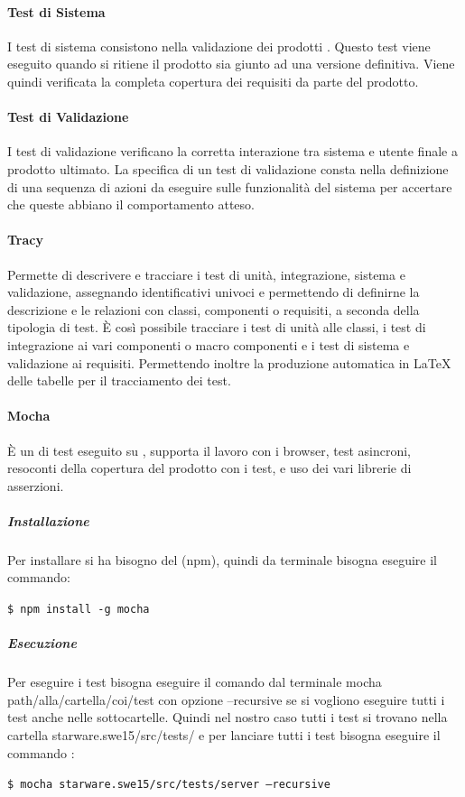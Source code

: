 \documentclass[12pt,a4paper]{article}
\begin{document}
\paragraph{Test di Sistema}

I test di sistema consistono nella validazione dei prodotti . Questo test viene eseguito quando si ritiene il prodotto sia giunto ad una versione definitiva. Viene quindi verificata la completa copertura dei requisiti da parte del prodotto.

\paragraph{Test di Validazione}

I test di validazione verificano la corretta interazione tra sistema e utente finale a prodotto ultimato.
La specifica di un test di validazione consta nella definizione di una sequenza di azioni da eseguire sulle funzionalità del sistema per accertare che queste abbiano il comportamento atteso.


\paragraph{Tracy}\label{tracciamentoTest}

Permette di descrivere e tracciare i test di unità, integrazione, sistema e validazione, assegnando identificativi univoci e permettendo di definirne la descrizione e le relazioni con classi, componenti o requisiti, a seconda della tipologia di test. È così possibile tracciare i test di unità alle classi, i test di integrazione ai vari componenti o macro componenti e i test di sistema e validazione ai requisiti.
Permettendo inoltre la produzione automatica in \LaTeX{} delle tabelle per il tracciamento dei test.

\paragraph{Mocha}\label{strumentoTest}
È un  di test eseguito su , supporta il lavoro con i browser, test asincroni, resoconti della copertura del prodotto con i test, e uso dei vari librerie di asserzioni.
\subparagraph{Installazione}
Per installare  si ha bisogno del  (npm), quindi da terminale bisogna eseguire il commando:
\begin{center}
	\texttt{\$ npm install -g mocha}  
\end{center}
\subparagraph{Esecuzione}
Per eseguire i test bisogna eseguire il comando dal terminale mocha path/alla/cartella/coi/test con opzione --recursive se si vogliono eseguire tutti i test anche nelle sottocartelle.
Quindi nel nostro caso tutti i test si trovano nella cartella starware.swe15/src/tests/ e per lanciare tutti i test bisogna eseguire il commando : 
\begin{center}
	\texttt{\$ mocha starware.swe15/src/tests/server --recursive
}
\end{center}
\end{document}
